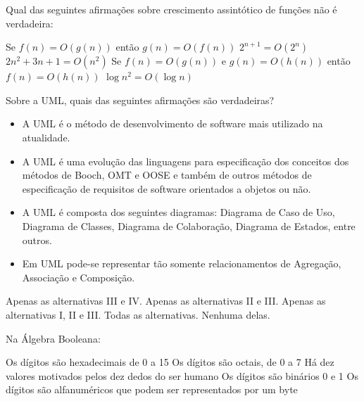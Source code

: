 \documentclass[12pt, addpoints]{exam}
\begin{document}
\begin{questions}
\question

Qual das seguintes afirmações sobre crescimento assintótico de funções não é verdadeira:
\begin{choices}
\choice Se \( f(n) = O(g(n)) \) então \( g(n) = O(f(n)) \)
\choice \( 2^{n+1} = O(2^n) \)
\choice \( 2n^2 + 3n + 1 = O(n^2) \)
\choice Se \( f(n) = O(g(n)) \) e \( g(n) = O(h(n)) \) então \( f(n) = O(h(n)) \)
\choice \( \log n^2 = O(\log n) \)
\end{choices}

\question

Sobre a UML, quais das seguintes afirmações são verdadeiras?



\begin{itemize}

    \item[I)] A UML é o método de desenvolvimento de software mais utilizado na atualidade.

    \item[II)] A UML é uma evolução das linguagens para especificação dos conceitos dos métodos de Booch, OMT e OOSE e também de outros métodos de especificação de requisitos de software orientados a objetos ou não.

    \item[III)] A UML é composta dos seguintes diagramas: Diagrama de Caso de Uso, Diagrama de Classes, Diagrama de Colaboração, Diagrama de Estados, entre outros.

    \item[IV)] Em UML pode-se representar tão somente relacionamentos de Agregação, Associação e Composição.

\end{itemize}
\begin{choices}
\choice Apenas as alternativas III e IV.
\choice Apenas as alternativas II e III.
\choice Apenas as alternativas I, II e III.
\choice Todas as alternativas.
\choice Nenhuma delas.
\end{choices}

\question

Na Álgebra Booleana:
\begin{choices}
\choice Os dígitos são hexadecimais de 0 a 15
\choice Os dígitos são octais, de 0 a 7
\choice Há dez valores motivados pelos dez dedos do ser humano
\choice Os dígitos são binários 0 e 1
\choice Os dígitos são alfanuméricos que podem ser representados por um byte
\end{choices}


\end{questions}
\end{document}
